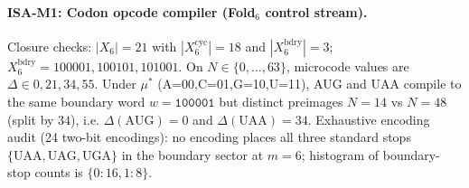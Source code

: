 \paragraph{ISA-M1: Codon opcode compiler (Fold$_6$ control stream).}
Closure checks: $|X_6|=21$ with $|X_6^{\mathrm{cyc}}|=18$ and $|X_6^{\mathrm{bdry}}|=3$; $X_6^{\mathrm{bdry}}={100001, 100101, 101001}$. On $N\in\{0,\dots,63\}$, microcode values are $\Delta\in{0,21,34,55}$.
Under $\mu^\ast$ (A=00,C=01,G=10,U=11), AUG and UAA compile to the same boundary word $w=\texttt{100001}$ but distinct preimages $N=14$ vs $N=48$ (split by $34$), i.e. $\Delta(\mathrm{AUG})=0$ and $\Delta(\mathrm{UAA})=34$.
Exhaustive encoding audit (24 two-bit encodings): no encoding places all three standard stops $\{\mathrm{UAA,UAG,UGA}\}$ in the boundary sector at $m=6$; histogram of boundary-stop counts is $\{0:16, 1:8\}$.
